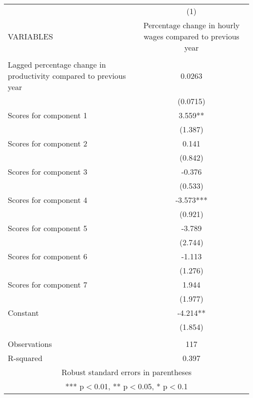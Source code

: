 \documentclass[]{article}
\begin{document}
\begin{tabular}{lc} \hline
 & (1) \\
VARIABLES & Percentage change in hourly wages compared to previous year \\ \hline
 &  \\
Lagged percentage change in productivity compared to previous year & 0.0263 \\
 & (0.0715) \\
Scores for component 1 & 3.559** \\
 & (1.387) \\
Scores for component 2 & 0.141 \\
 & (0.842) \\
Scores for component 3 & -0.376 \\
 & (0.533) \\
Scores for component 4 & -3.573*** \\
 & (0.921) \\
Scores for component 5 & -3.789 \\
 & (2.744) \\
Scores for component 6 & -1.113 \\
 & (1.276) \\
Scores for component 7 & 1.944 \\
 & (1.977) \\
Constant & -4.214** \\
 & (1.854) \\
 &  \\
Observations & 117 \\
 R-squared & 0.397 \\ \hline
\multicolumn{2}{c}{ Robust standard errors in parentheses} \\
\multicolumn{2}{c}{ *** p$<$0.01, ** p$<$0.05, * p$<$0.1} \\
\end{tabular}
\end{document}
